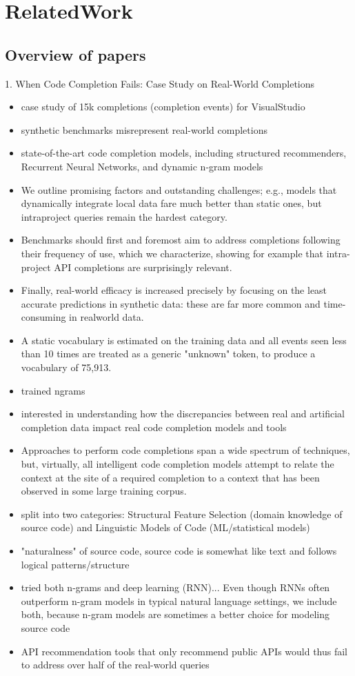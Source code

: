 \chapter{RelatedWork}
\label{chap:RelatedWork}

\section{Overview of papers}
1. When Code Completion Fails: Case Study on
Real-World Completions
\begin{itemize}
	\item case study of 15k completions (completion events) for VisualStudio
	\item synthetic benchmarks misrepresent real-world completions
	\item state-of-the-art code completion models, including structured recommenders, Recurrent Neural Networks, and dynamic n-gram models
    \item We outline promising factors and outstanding challenges; e.g., models that dynamically integrate local data fare much better than static ones, but intraproject queries remain the hardest category.
    \item Benchmarks should first and foremost aim to address completions following their frequency of use, which we characterize, showing for example that intra-project API completions are surprisingly relevant.
    \item Finally, real-world efficacy is increased precisely by focusing on the least accurate predictions in synthetic data: these are far more common and time-consuming in realworld data.
    \item A static vocabulary is estimated on the training data and all events seen less than 10 times are treated as a generic "unknown" token, to produce a vocabulary of 75,913.
    \item trained ngrams
    \item interested in understanding how the discrepancies between real and artificial completion data impact real code completion models and tools
    \item Approaches to perform code completions span a wide spectrum of techniques, but, virtually, all intelligent code completion models attempt to relate the context at the site of a required completion to a context that has been observed in some large training corpus.
    \item split into two categories: Structural Feature Selection (domain knowledge of source code) and Linguistic Models of Code (ML/statistical models)
    \item "naturalness" of source code, source code is somewhat like text and follows logical patterns/structure
    \item tried both n-grams and deep learning (RNN)... Even though RNNs often outperform n-gram models in typical natural language settings, we include both, because n-gram models are sometimes a better choice for modeling source code
    \item API recommendation tools that only recommend public APIs would thus fail to address over half of the real-world queries
\end{itemize}